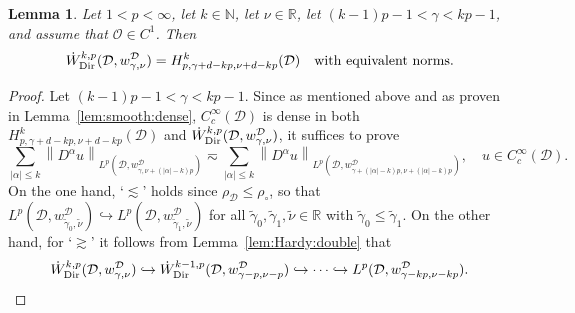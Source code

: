 \documentclass[12pt,a4paper, reqno]{amsart}
\theoremstyle{plain}
\newtheorem{lemma}[theorem]{Lemma}
\theoremstyle{definition}
\theoremstyle{remark}
\numberwithin{equation}{section}
\newcommand{\1}{\mathbbm{1}}
\newcommand{\R}{\ensuremath{\mathbb{R}}}
\newcommand{\N}{\ensuremath{\mathbb{N}}}
\newcommand{\calO}{\ensuremath{\mathcal{O}}}
\newcommand{\calD}{\ensuremath{\mathcal{D}}}
\newcommand{\Dir}{\textup{Dir}}
\newcommand{\nrm}[1]{\left\lVert #1 \right\rVert}
\begin{document}
\begin{lemma}\label{lem:Krylov:Kondratiev:eq2}
Let  $1<p<\infty$, let $k\in\N$, let $\nu\in\R$, let $(k-1)p-1<\gamma <kp-1$, and assume that $\calO\in C^1$.
Then 
\begin{equation}
    \Dot W_\Dir^{k,p}(\calD,w_{\gamma,\nu}^\calD)= H^k_{p,\gamma+d-kp,\nu+d-kp}(\calD) \quad \text{with equivalent norms.}
\end{equation}
\end{lemma}
\begin{proof}


Let $(k-1)p-1<\gamma<kp-1$. Since as mentioned above and as proven in Lemma~\ref{lem:smooth:dense}, $C_c^\infty(\calD)$ is dense in both $H^k_{p,\gamma+d-kp,\nu+d-kp}(\calD)$ and $\Dot{W}_\Dir^{k,p}(\calD,w_{\gamma,\nu}^\calD)$, it suffices to prove 
\[
\sum_{\lvert\alpha\rvert\leq k} \nrm{D^\alpha u}_{L^p(\calD,w_{\gamma,\nu +(\lvert\alpha\rvert-k)p}^\calD)} 
\eqsim 
\sum_{\lvert\alpha\rvert\leq k} \nrm{D^\alpha u}_{L^p(\calD,w_{\gamma +(\lvert\alpha\rvert-k)p,\nu+(\lvert\alpha\rvert-k)p}^\calD)},\quad u\in C_c^\infty(\calD).
\]
On the one hand, `$\lesssim$' holds since $\rho_\calD\leq \rho_\circ$, so that $L^p(\calD,w_{\tilde{\gamma}_0,\tilde{\nu}}^\calD)\hookrightarrow L^p(\calD,w_{\tilde{\gamma}_1,\tilde{\nu}}^\calD)$ for all $\tilde{\gamma}_0,\tilde{\gamma}_1,\tilde\nu\in\R$ with $\tilde\gamma_0\leq\tilde\gamma_1$. 
On the other hand, for `$\gtrsim$' it follows from Lemma~\ref{lem:Hardy:double}
that
\[
\Dot{W}^{k,p}_\Dir(\calD,w_{\gamma,\nu}^\calD)
\hookrightarrow \Dot W_\Dir^{k-1,p}(\calD,w_{\gamma-p,\nu-p}^\calD)\hookrightarrow \dots
\hookrightarrow
L^p(\calD,w_{\gamma-kp,\nu-kp}^\calD).
\]
\end{proof}
\end{document}
